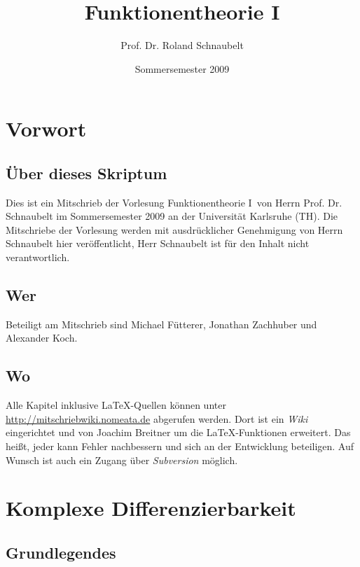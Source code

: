 \documentclass[a4paper,twoside,DIV15,BCOR12mm]{scrbook}
\author{Prof. Dr. Roland Schnaubelt}
\title{Funktionentheorie I}
\date{Sommersemester 2009}
\begin{document}
\maketitle

\chapter*{Vorwort}

\section*{Über dieses Skriptum}
Dies ist ein Mitschrieb der Vorlesung \glqq Funktionentheorie I\grqq\
von Herrn Prof. Dr. Schnaubelt im Sommersemester 2009 an der Universität Karlsruhe (TH).
Die Mitschriebe der Vorlesung werden mit ausdrücklicher Genehmigung von Herrn Schnaubelt hier veröffentlicht,
Herr Schnaubelt ist für den Inhalt nicht verantwortlich.

\section*{Wer}
Beteiligt am Mitschrieb sind Michael Fütterer, Jonathan Zachhuber und
Alexander Koch.

\section*{Wo}
Alle Kapitel inklusive \LaTeX-Quellen können unter \url{http://mitschriebwiki.nomeata.de} abgerufen werden.
Dort ist ein \emph{Wiki} eingerichtet und von Joachim Breitner um die \LaTeX-Funktionen erweitert.
Das heißt, jeder kann Fehler nachbessern und sich an der Entwicklung
beteiligen. Auf Wunsch ist auch ein Zugang über \emph{Subversion} möglich.


\tableofcontents




\chapter{Komplexe Differenzierbarkeit}

\section{Grundlegendes}


\end{document}
